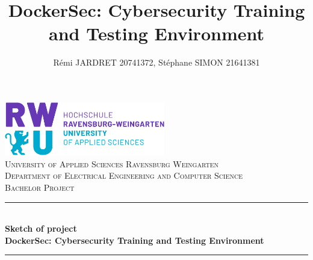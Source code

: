 \documentclass[a4paper,11pt,singlespacing]{article}
\title{DockerSec: Cybersecurity Training and Testing Environment}
\author{
	Rémi JARDRET 20741372,
	Stéphane SIMON 21641381
	}
\begin{document}
\setlength{\parindent}{0ex}


\begin{titlepage}
	
	\newcommand{\HRule}{\rule{\linewidth}{0.5mm}} %
	
	\center %
	
		
	
	\includegraphics[width=7cm]{Images/rwu_logo.png}\\[1.5cm] %
	
	\textsc{\LARGE University of Applied Sciences Ravensburg Weingarten}\\[1.5cm] 
	\textsc{\Large Department of
		Electrical Engineering
		and Computer Science}\\[0.5cm]
	\textsc{\large Bachelor Project}\\[0.5cm] 
	
	
	\HRule \\[0.4cm]
	{ \huge \bfseries Sketch of project\\ DockerSec: Cybersecurity Training and Testing Environment}\\[0.4cm] 
	\HRule \\[3.5cm]
	
	

\end{titlepage}
\end{document}
